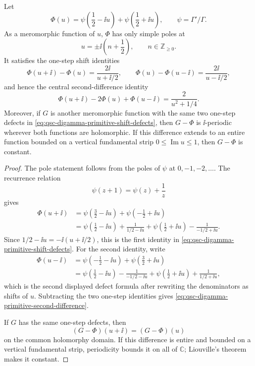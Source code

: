 \begin{lemma}
\label{lem:qsc-half-integer-digamma-primitive}
Let
\[
  \Phi(u)=
  \psi\!\left(\frac12-\ii u\right)
  +\psi\!\left(\frac12+\ii u\right),
  \qquad \psi=\Gamma'/\Gamma .
\]
As a meromorphic function of \(u\), \(\Phi\) has only simple poles at
\[
  u=\pm\ii\left(n+\frac12\right),\qquad n\in\mathbb Z_{\ge0}.
\]
It satisfies the one-step shift identities
\begin{equation}
  \Phi(u+\ii)-\Phi(u)=\frac{2\ii}{u+\ii/2},
  \qquad
  \Phi(u)-\Phi(u-\ii)=\frac{2\ii}{u-\ii/2},
  \label{eq:qsc-digamma-primitive-shift-defects}
\end{equation}
and hence the central second-difference identity
\begin{equation}
  \Phi(u+\ii)-2\Phi(u)+\Phi(u-\ii)
  =
  \frac{2}{u^2+1/4}.
  \label{eq:qsc-digamma-primitive-second-difference}
\end{equation}
Moreover, if \(G\) is another meromorphic function with the same two
one-step defects in \eqref{eq:qsc-digamma-primitive-shift-defects}, then
\(G-\Phi\) is \(\ii\)-periodic wherever both functions are holomorphic.  If
this difference extends to an entire function bounded on a vertical
fundamental strip \(0\leq \operatorname{Im}u\leq1\), then \(G-\Phi\) is
constant.
\end{lemma}

\begin{proof}
The pole statement follows from the poles of \(\psi\) at
\(0,-1,-2,\ldots\).  The recurrence relation
\[
  \psi(z+1)=\psi(z)+\frac1z
\]
gives
\[
\begin{aligned}
  \Phi(u+\ii)
  &=
  \psi\!\left(\frac32-\ii u\right)
  +\psi\!\left(-\frac12+\ii u\right)  \\
  &=
  \psi\!\left(\frac12-\ii u\right)
  +\frac{1}{1/2-\ii u}
  +\psi\!\left(\frac12+\ii u\right)
  -\frac{1}{-1/2+\ii u}.
\end{aligned}
\]
Since \(1/2-\ii u=-\ii(u+\ii/2)\), this is the first identity in
\eqref{eq:qsc-digamma-primitive-shift-defects}.  For the second identity,
write
\[
\begin{aligned}
  \Phi(u-\ii)
  &=
  \psi\!\left(-\frac12-\ii u\right)
  +\psi\!\left(\frac32+\ii u\right)\\
  &=
  \psi\!\left(\frac12-\ii u\right)
  -\frac{1}{-1/2-\ii u}
  +\psi\!\left(\frac12+\ii u\right)
  +\frac{1}{1/2+\ii u},
\end{aligned}
\]
which is the second displayed defect formula after rewriting the denominators
as shifts of \(u\).  Subtracting the two one-step identities gives
\eqref{eq:qsc-digamma-primitive-second-difference}.

If \(G\) has the same one-step defects, then
\[
  (G-\Phi)(u+\ii)=(G-\Phi)(u)
\]
on the common holomorphy domain.  If this difference is entire and bounded
on a vertical fundamental strip, periodicity bounds it on all of
\(\mathbb C\); Liouville's theorem makes it constant.
\end{proof}


